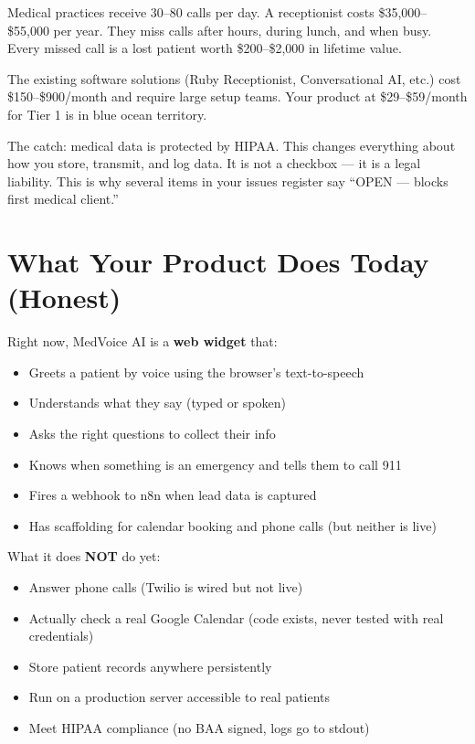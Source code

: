 \documentclass[12pt, a4paper]{report}
\begin{document}
Medical practices receive 30--80 calls per day. A receptionist costs \$35,000--\$55,000
per year. They miss calls after hours, during lunch, and when busy. Every missed call is
a lost patient worth \$200--\$2,000 in lifetime value.

The existing software solutions (Ruby Receptionist, Conversational AI, etc.) cost
\$150--\$900/month and require large setup teams. Your product at \$29--\$59/month for
Tier 1 is in blue ocean territory.

\begin{warningbox}
  The catch: medical data is protected by HIPAA. This changes everything about how you
  store, transmit, and log data. It is not a checkbox --- it is a legal liability. This
  is why several items in your issues register say ``OPEN --- blocks first medical
  client.''
\end{warningbox}

\section{What Your Product Does Today (Honest)}

Right now, MedVoice AI is a \textbf{web widget} that:

\begin{itemize}
  \item Greets a patient by voice using the browser's text-to-speech
  \item Understands what they say (typed or spoken)
  \item Asks the right questions to collect their info
  \item Knows when something is an emergency and tells them to call 911
  \item Fires a webhook to n8n when lead data is captured
  \item Has scaffolding for calendar booking and phone calls (but neither is live)
\end{itemize}

What it does \textbf{NOT} do yet:

\begin{itemize}
  \item Answer phone calls (Twilio is wired but not live)
  \item Actually check a real Google Calendar (code exists, never tested with real credentials)
  \item Store patient records anywhere persistently
  \item Run on a production server accessible to real patients
  \item Meet HIPAA compliance (no BAA signed, logs go to stdout)
\end{itemize}
\end{document}
